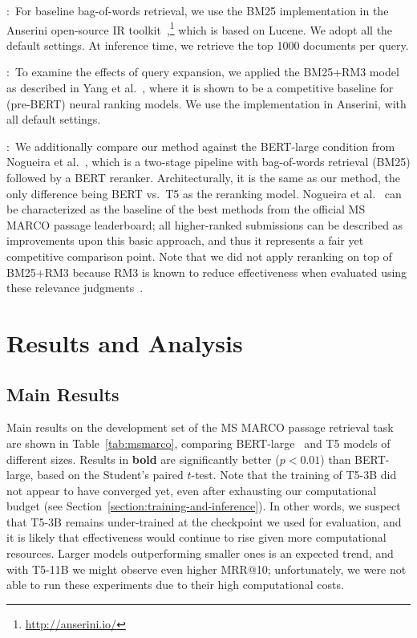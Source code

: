 \documentclass{article}
\begin{document}
\smallskip {}:\
For baseline bag-of-words retrieval, we use the BM25 implementation in the Anserini open-source IR toolkit~\cite{yang2017anserini},\footnote{\url{http://anserini.io/}} which is based on Lucene.
We adopt all the default settings.
At inference time, we retrieve the top 1000 documents per query.

\smallskip {}:\ 
To examine the effects of query expansion, we applied the BM25+RM3 model as described in Yang et al.~\cite{yang2019critically}, where it is shown to be a competitive baseline for (pre-BERT) neural ranking models.
We use the implementation in Anserini, with all default settings.

\smallskip \noindent {\bf BM25+BERT-large}:\ 
We additionally compare our method against the BERT-large condition from Nogueira et al.~\cite{Nogueira_etal_arXiv2019_multistageBERT}, which is a two-stage pipeline with bag-of-words retrieval (BM25) followed by a BERT reranker.
Architecturally, it is the same as our method, the only difference being BERT vs.\ T5 as the reranking model.
Nogueira et al.~\cite{Nogueira_etal_arXiv2019_multistageBERT} can be characterized as the baseline of the best methods from the official MS MARCO passage leaderboard; all higher-ranked submissions can be described as improvements upon this basic approach, and thus it represents a fair yet competitive comparison point.
Note that we did not apply reranking on top of BM25+RM3 because RM3 is known to reduce effectiveness when evaluated using these relevance judgments~\cite{Nogueira_etal_arXiv2019}.

\section{Results and Analysis}

\subsection{Main Results}

Main results on the development set of the MS MARCO passage retrieval task are shown in Table~\ref{tab:msmarco}, comparing BERT-large~\cite{Nogueira:1901.04085:2019} and T5 models of different sizes.
Results in \textbf{bold} are significantly better ($p<0.01$) than BERT-large, based on the Student's paired $t$-test.
Note that the training of T5-3B did not appear to have converged yet, even after exhausting our computational budget (see Section~\ref{section:training-and-inference}).
In other words, we suspect that T5-3B remains under-trained at the checkpoint we used for evaluation, and it is likely that effectiveness would continue to rise given more computational resources.
Larger models outperforming smaller ones is an expected trend, and with T5-11B we might observe even higher MRR@10; unfortunately, we were not able to run these experiments due to their high computational costs.
\end{document}
